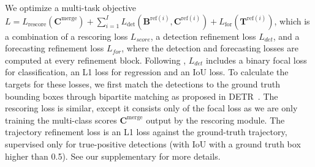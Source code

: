 We optimize a multi-task objective
$L = L_{\mathrm{rescore}}(\mathbf{C}^\mathrm{merge}) + \sum_{i=1}^I L_{\mathrm{det}}(\mathbf{B}^{\mathrm{ref}(i)}, \mathbf{C}^{\mathrm{ref}(i)}) + L_{\mathrm{for}}(\mathbf{T}^{\mathrm{ref}(i)})$,
which is a combination of
a rescoring loss $L_{score}$,
a detection refinement loss $L_{det}$,
and a forecasting refinement loss $L_{for}$, where the detection and forecasting losses are computed at
every refinement block.
Following \cite{casas2024detra}, $L_{det}$ includes
a binary focal loss for classification,
an L1 loss for regression and an IoU loss.
To calculate the targets for these losses,
we first match the detections to the ground truth
bounding boxes through bipartite matching as
proposed in DETR~\cite{carion2020end}.
The rescoring loss is similar, except it consists
only of the focal loss as we are only training the multi-class scores $\mathbf{C}^\mathrm{merge}$ output by the rescoring module.
The trajectory refinement loss is an L1 loss
against the ground-truth trajectory, supervised only for
true-positive detections (with IoU with a ground truth box higher than 0.5).
See our supplementary for more details.